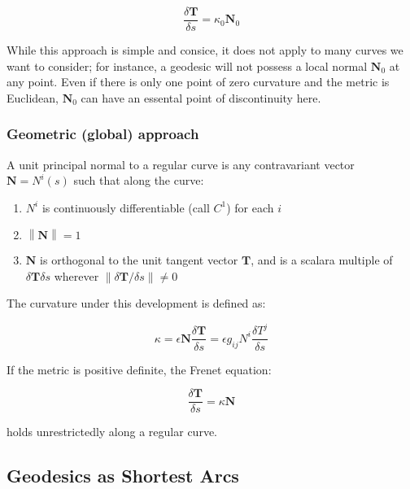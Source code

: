 \documentclass{article}
\newcommand\norm[1]{\left\lVert#1\right\rVert}
\begin{document}
\begin{equation}
	\frac{ \delta \mathbf{ T } }{ \delta s } = \kappa_0 \mathbf{ N }_0
\end{equation}

While this approach is simple and consice, it does not apply to many curves we want to consider; for instance, a geodesic will not possess a local normal $\mathbf{ N }_0$ at any point.  Even if there is only
one point of zero curvature and the metric is Euclidean, $\mathbf{ N }_0$ can have an essental point of discontinuity here.

\subsubsection{Geometric (global) approach}

A unit principal normal to a regular curve is any contravariant vector $\mathbf{ N } = N^i(s)$ such that along the curve:

\begin{enumerate}
	\item $N^i$ is continuously differentiable (call $C^1$) for each $i$
	\item $\norm{ \mathbf{ N } } = 1$
	\item $\mathbf{ N }$ is orthogonal to the unit tangent vector $\mathbf{ T }$, and is a scalara multiple of $\delta \mathbf{ T } \delta s$ wherever $\norm{ \delta \mathbf{ T } / \delta s } \neq 0$
\end{enumerate}

The curvature under this development is defined as:

\begin{equation}
	\kappa = \epsilon \mathbf{ N } \frac{ \delta \mathbf{ T } }{ \delta s } = \epsilon g_{ij} N^i \frac{ \delta T^j }{ \delta s }
\end{equation}

\noindent
If the metric is positive definite, the Frenet equation:

\begin{equation}
	\frac{ \delta \mathbf{ T } }{ \delta s } = \kappa \mathbf{ N }
\end{equation}

\noindent
holds unrestrictedly along a regular curve.

\subsection{Geodesics as Shortest Arcs}
\end{document}
